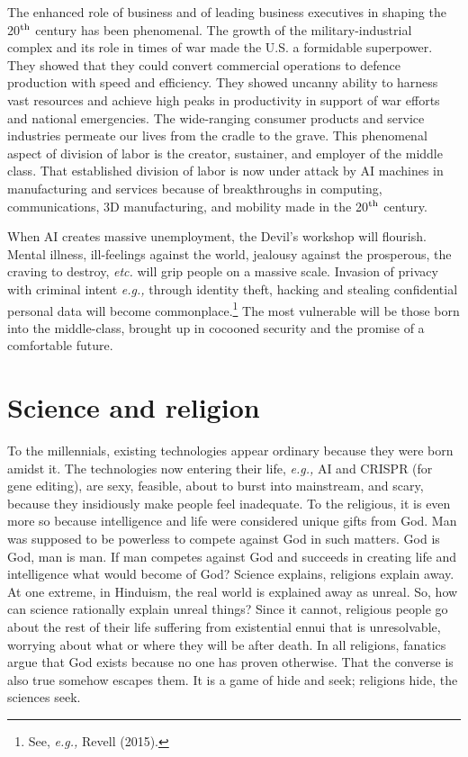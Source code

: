 \begin{multicols}{2}
The enhanced role of business and of leading business executives in shaping the 20$^{\rm th}$ century has been phenomenal. The growth of the military-industrial complex and its role in times of war made the U.S. a formidable superpower. They showed that they could convert commercial operations to defence production with speed and efficiency. They showed uncanny ability to harness vast resources and achieve high peaks in productivity in support of war efforts and national emergencies. The wide-ranging consumer products and service industries permeate our lives from the cradle to the grave. This phenomenal aspect of division of labor is the creator, sustainer, and employer of the middle class. That established division of labor is now under attack by AI machines in manufacturing and services because of breakthroughs in computing, communications, 3D manufacturing, and mobility made in the 20$^{\rm th}$ century.

When AI creates massive unemployment, the Devil's workshop will flourish. Mental illness, ill-feelings against the world, jealousy against the prosperous, the craving to destroy, \textit{etc.} will grip people on a massive scale. Invasion of privacy with criminal intent \textit{e.g.,} through identity theft, hacking and stealing confidential personal data will become commonplace.\footnote{See, \textit{e.g.,} Revell (2015).}  The most vulnerable will be those born into the middle-class, brought up in cocooned security and the promise of a comfortable future.
\medskip

\section{Science and religion}

To the millennials, existing technologies appear ordinary because they were born amidst it. The technologies now entering their life, \textit{e.g.,} AI and CRISPR (for gene editing), are sexy, feasible, about to burst into mainstream, and scary, because they insidiously make people feel inadequate. To the religious, it is even more so because intelligence and life were considered unique gifts from God. Man was supposed to be powerless to compete against God in such matters. God is God, man is man. If man competes against God and succeeds in creating life and intelligence what would become of God? Science explains, religions explain away. At one extreme, in Hinduism, the real world is explained away as unreal. So, how can science rationally explain unreal things? Since it cannot, religious people go about the rest of their life suffering from existential ennui that is unresolvable, worrying about what or where they will be after death. In all religions, fanatics argue that God exists because no one has proven otherwise. That the converse is also true somehow escapes them. It is a game of hide and seek; religions hide, the sciences seek.


\end{multicols}
